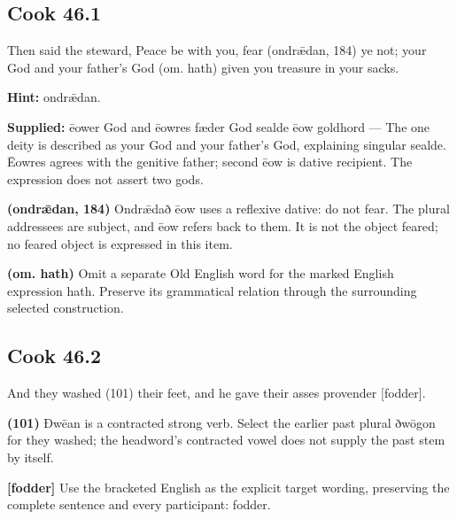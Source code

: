 \par\begin{minipage}{\linewidth}\raggedright
\subsection*{Cook 46.1}

Then said the steward, Peace be with you, fear (ondrǣdan, 184) ye not; your God and your father’s God (om. hath) given you treasure in your sacks.

\textbf{Hint:} ondrǣdan.

\end{minipage}\par\addvspace{4pt}

\textbf{Supplied:} ēower God and ēowres fæder God sealde ēow goldhord — The one deity is described as your God and your father’s God, explaining singular sealde. Ēowres agrees with the genitive father; second ēow is dative recipient. The expression does not assert two gods.

\textbf{(ondrǣdan, 184)} Ondrǣdað ēow uses a reflexive dative: do not fear. The plural addressees are subject, and ēow refers back to them. It is not the object feared; no feared object is expressed in this item.

\textbf{(om. hath)} Omit a separate Old English word for the marked English expression hath. Preserve its grammatical relation through the surrounding selected construction.

\par\begin{minipage}{\linewidth}\raggedright
\subsection*{Cook 46.2}

And they washed (101) their feet, and he gave their asses provender [fodder].

\textbf{(101)} Ðwēan is a contracted strong verb. Select the earlier past plural ðwōgon for they washed; the headword’s contracted vowel does not supply the past stem by itself.

\textbf{[fodder]} Use the bracketed English as the explicit target wording, preserving the complete sentence and every participant: fodder.

\end{minipage}\par\addvspace{4pt}

